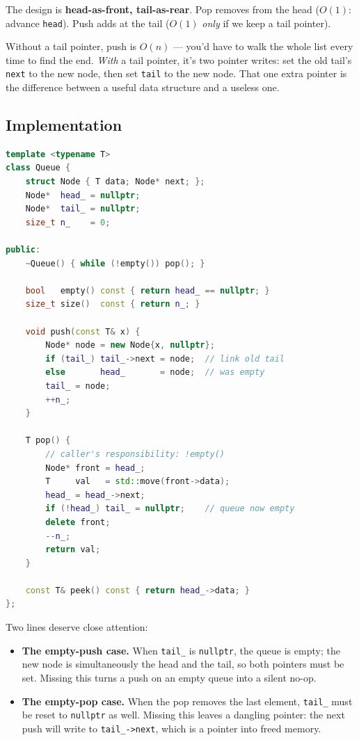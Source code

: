 \documentclass[11pt]{article}
\begin{document}
The design is \textbf{head-as-front, tail-as-rear}. Pop removes
from the head ($O(1)$: advance \texttt{head}). Push adds at the
tail ($O(1)$ \emph{only} if we keep a tail pointer).

\begin{ideabox}
Without a tail pointer, push is $O(n)$ --- you'd have to walk the
whole list every time to find the end. \emph{With} a tail
pointer, it's two pointer writes: set the old tail's
\texttt{next} to the new node, then set \texttt{tail} to the new
node. That one extra pointer is the difference between a useful
data structure and a useless one.
\end{ideabox}

\subsection*{Implementation}

\begin{examplebox}
\begin{lstlisting}[language=C++,basicstyle=\ttfamily\small,frame=single]
template <typename T>
class Queue {
    struct Node { T data; Node* next; };
    Node*  head_ = nullptr;
    Node*  tail_ = nullptr;
    size_t n_    = 0;

public:
    ~Queue() { while (!empty()) pop(); }

    bool   empty() const { return head_ == nullptr; }
    size_t size()  const { return n_; }

    void push(const T& x) {
        Node* node = new Node{x, nullptr};
        if (tail_) tail_->next = node;  // link old tail
        else       head_       = node;  // was empty
        tail_ = node;
        ++n_;
    }

    T pop() {
        // caller's responsibility: !empty()
        Node* front = head_;
        T     val   = std::move(front->data);
        head_ = head_->next;
        if (!head_) tail_ = nullptr;    // queue now empty
        delete front;
        --n_;
        return val;
    }

    const T& peek() const { return head_->data; }
};
\end{lstlisting}
\end{examplebox}

Two lines deserve close attention:

\begin{itemize}[leftmargin=*]
    \item \textbf{The empty-push case.} When \texttt{tail\_} is
          \texttt{nullptr}, the queue is empty; the new node is
          simultaneously the head and the tail, so both pointers
          must be set. Missing this turns a push on an empty
          queue into a silent no-op.
    \item \textbf{The empty-pop case.} When the pop removes the
          last element, \texttt{tail\_} must be reset to
          \texttt{nullptr} as well. Missing this leaves a
          dangling pointer: the next push will write to
          \texttt{tail\_->next}, which is a pointer into freed
          memory.
\end{itemize}
\end{document}
